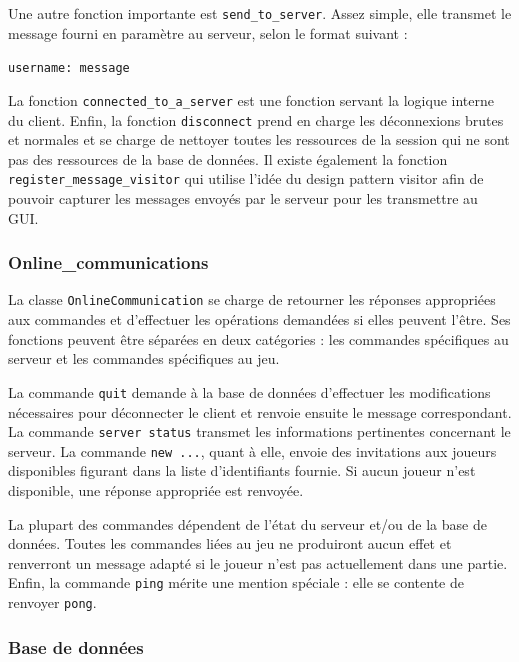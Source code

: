 \documentclass[11pt]{article}
\begin{document}
Une autre fonction importante est \texttt{send\_to\_server}. Assez simple, elle transmet le message fourni en paramètre au serveur, selon le format suivant :

\begin{center}
    \texttt{username: message}
\end{center}

La fonction \texttt{connected\_to\_a\_server} est une fonction servant la logique interne du client. Enfin, la fonction \texttt{disconnect} prend en charge les déconnexions brutes et normales et se charge de nettoyer toutes les ressources de la session qui ne sont pas des ressources de la base de données. Il existe également la fonction \texttt{register\_message\_visitor} qui utilise l'idée du design pattern visitor afin de pouvoir capturer les messages envoyés par le serveur pour les transmettre au GUI.


\subsubsection{Online\_communications}

La classe \texttt{OnlineCommunication} se charge de retourner les réponses appropriées aux commandes et d'effectuer les opérations demandées si elles peuvent l'être. Ses fonctions peuvent être séparées en deux catégories : les commandes spécifiques au serveur et les commandes spécifiques au jeu.

La commande \texttt{quit} demande à la base de données d'effectuer les modifications nécessaires pour déconnecter le client et renvoie ensuite le message correspondant. La commande \texttt{server status} transmet les informations pertinentes concernant le serveur. La commande \texttt{new~...}, quant à elle, envoie des invitations aux joueurs disponibles figurant dans la liste d'identifiants fournie. Si aucun joueur n'est disponible, une réponse appropriée est renvoyée.

La plupart des commandes dépendent de l'état du serveur et/ou de la base de données. Toutes les commandes liées au jeu ne produiront aucun effet et renverront un message adapté si le joueur n'est pas actuellement dans une partie. Enfin, la commande \texttt{ping} mérite une mention spéciale : elle se contente de renvoyer \texttt{pong}.

\subsubsection{Base de données}
\end{document}

